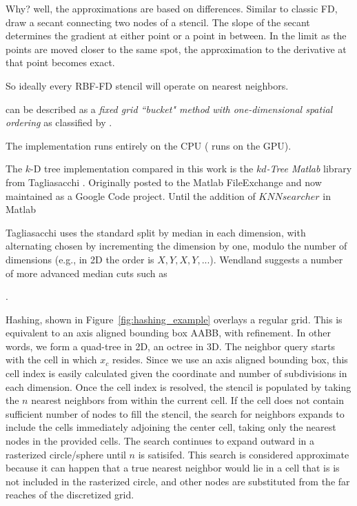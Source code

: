 \documentclass{report}
\begin{document}
Why? well, the approximations are based on differences. Similar to classic FD,
draw a secant connecting two nodes of a stencil. The slope of the secant
determines the gradient at either point or a point in between. In the limit as
the points are moved closer to the same spot, the approximation to the
derivative at that point becomes exact. 

So ideally every RBF-FD stencil will operate on nearest neighbors. 



 can be described as a \emph{fixed grid ``bucket" method with one-dimensional spatial ordering} as classified by \cite{Samet2005}. 

The implementation runs entirely on the CPU (\cite{Krog2010} runs on the GPU). 

The $k$-D tree implementation compared in this work is the \emph{$kd$-Tree Matlab} library from Tagliasacchi \cite{TagliasacchiMFE,TagliasacchiGC}. Originally posted to the Matlab FileExchange and now maintained as a Google Code project. Until the addition of $KNNsearcher$ in Matlab 

Tagliasacchi \cite{TagliasacchiGC} uses the standard split by median in each dimension, with alternating chosen by incrementing the dimension by one, modulo the number of dimensions (e.g., in 2D the order is $X, Y, X, Y, ...$). Wendland \cite{WendlandBook} suggests a number of more advanced median cuts such as 

\cite{TagliasacchiMFE}. 
\cite{MatlabKDTreeSearcher}

Hashing, shown in Figure~\ref{fig:hashing_example} overlays a regular grid. This is equivalent to an axis aligned bounding box AABB, with refinement. In other words, we form a quad-tree in 2D, an octree in 3D. The neighbor query starts with the cell in which $x_c$ resides. Since we use an axis aligned bounding box, this cell index is easily calculated given the coordinate and number of subdivisions in each dimension. Once the cell index is resolved, the stencil is populated by taking the $n$ nearest neighbors from within the current cell. If the cell does not contain sufficient number of nodes to fill the stencil, the search for neighbors expands to include the cells immediately adjoining the center cell, taking only the nearest nodes in the provided cells. The search continues to expand outward in a rasterized circle/sphere until $n$ is satisifed. This search is considered approximate because it can happen that a true nearest neighbor would lie in a cell that is is not included in the rasterized circle, and other nodes are substituted from the far reaches of the discretized grid.
\end{document}
